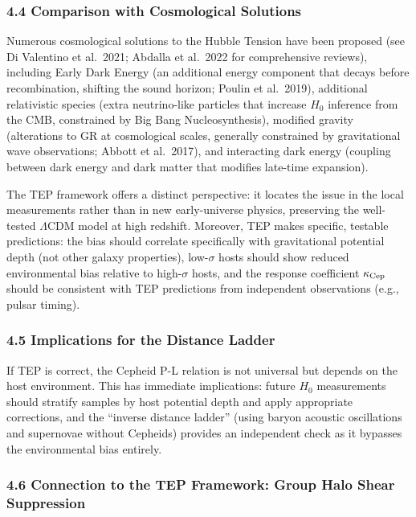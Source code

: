 \documentclass[
]{article}
\begin{document}
\subsubsection{4.4 Comparison with Cosmological
Solutions}\label{comparison-with-cosmological-solutions}

Numerous cosmological solutions to the Hubble Tension have been proposed
(see Di Valentino et al.~2021; Abdalla et al.~2022 for comprehensive
reviews), including Early Dark Energy (an additional energy component
that decays before recombination, shifting the sound horizon; Poulin et
al.~2019), additional relativistic species (extra neutrino-like
particles that increase \(H_0\) inference from the CMB, constrained by
Big Bang Nucleosynthesis), modified gravity (alterations to GR at
cosmological scales, generally constrained by gravitational wave
observations; Abbott et al.~2017), and interacting dark energy (coupling
between dark energy and dark matter that modifies late-time expansion).

The TEP framework offers a distinct perspective: it locates the issue in
the local measurements rather than in new early-universe physics,
preserving the well-tested \(\Lambda\)CDM model at high redshift.
Moreover, TEP makes specific, testable predictions: the bias should
correlate specifically with gravitational potential depth (not other
galaxy properties), low-\(\sigma\) hosts should show reduced
environmental bias relative to high-\(\sigma\) hosts, and the response
coefficient \(\kappa_{\rm Cep}\) should be consistent with TEP
predictions from independent observations (e.g., pulsar timing).

\subsubsection{4.5 Implications for the Distance
Ladder}\label{implications-for-the-distance-ladder}

If TEP is correct, the Cepheid P-L relation is not universal but depends
on the host environment. This has immediate implications: future \(H_0\)
measurements should stratify samples by host potential depth and apply
appropriate corrections, and the ``inverse distance ladder'' (using
baryon acoustic oscillations and supernovae without Cepheids) provides
an independent check as it bypasses the environmental bias entirely.

\subsubsection{4.6 Connection to the TEP Framework: Group Halo Shear
Suppression}\label{connection-to-the-tep-framework-group-halo-shear-suppression}
\end{document}

